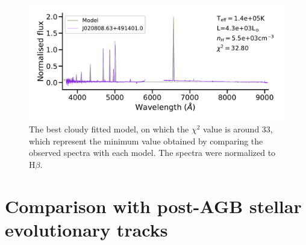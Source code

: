 \documentclass[fleqn,usenatbib]{mnras}
\begin{document}
\begin{figure}
\centering
\includegraphics[width=\linewidth, trim=10 90 10 10, clip]{Figs/model_140000_37.22_3.74.pdf}
\caption{The best {\sc cloudy} fitted model, on which the $\chi^2$ value is around 33, which
  represent the  minimum value obtained by comparing the observed spectra with each model.
  The spectra were normalized to H{$\beta$}.} 
  \label{fig:spectra-obs-model}
\end{figure}

\section{Comparison with post-AGB stellar evolutionary tracks}
\label{sec:tracks}
\end{document}

